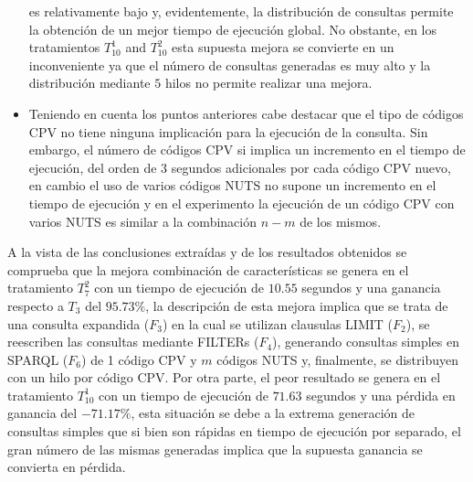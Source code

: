 \begin{itemize}
es relativamente bajo y, evidentemente, la distribución de consultas permite la obtención de un mejor tiempo de ejecución 
global. No obstante, en los tratamientos $T^{1}_{10}$ and $T^{2}_{10}$ esta supuesta mejora se convierte en un inconveniente 
ya que el número de consultas generadas es muy alto y la distribución mediante $5$ hilos no permite realizar una mejora.
\item Teniendo en cuenta los puntos anteriores cabe destacar que el tipo de códigos CPV no tiene ninguna implicación para 
la ejecución de la consulta. Sin embargo, el número de códigos \gls{CPV} si implica un incremento en el tiempo de ejecución, del orden 
de $3$ segundos adicionales por cada código CPV nuevo, en cambio el uso de varios códigos NUTS no supone un incremento en el tiempo 
de ejecución y en el experimento la ejecución de un código CPV con varios \gls{NUTS} es similar a la combinación $n-m$ de los mismos.
\end{itemize}

A la vista de las conclusiones extraídas y de los resultados obtenidos se comprueba que la mejora combinación de características se 
genera en el tratamiento $T^{2}_7$ con un tiempo de ejecución de $10.55$ segundos y una ganancia respecto a  $T_3$ del $95.73 \%$, la descripción 
de esta mejora implica que se trata de una consulta expandida ($F_3$) en la cual se utilizan clausulas LIMIT ($F_2$), se reescriben 
las consultas mediante FILTERs ($F_4$), generando consultas simples en SPARQL ($F_6$) de 1 código CPV y $m$ códigos NUTS y, finalmente, 
se distribuyen con un hilo por código CPV. Por otra parte, el peor resultado se genera en el tratamiento $T^{1}_{10}$ con un tiempo de 
ejecución de $71.63$ segundos y una pérdida en ganancia del $-71.17 \%$, esta situación se debe a la extrema generación de consultas 
simples que si bien son rápidas en tiempo de ejecución por separado, el gran número de las mismas generadas implica que la supuesta 
ganancia se convierta en pérdida.

